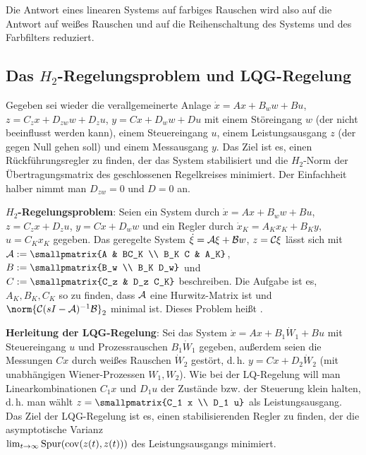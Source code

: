 Die Antwort eines linearen Systems auf farbiges Rauschen wird also auf die Antwort auf weißes
Rauschen und auf die Reihenschaltung des Systems und des Farbfilters reduziert.

\pagebreak

\subsection{%
    Das \texorpdfstring{$H_2$-Regelungsproblem}{H₂-Regelungsproblem} und
    LQG-Regelung%
}

Gegeben sei wieder die verallgemeinerte Anlage $\dot{x} = Ax + B_w w + Bu$,
$z = C_z x + D_{zw} w + D_z u$, $y = Cx + D_w w + Du$
mit einem Störeingang $w$ (der nicht beeinflusst werden kann),
einem Steuereingang $u$,
einem Leistungsausgang $z$ (der gegen Null gehen soll) und
einem Messausgang $y$.
Das Ziel ist es, einen Rückführungsregler zu finden, der das System stabilisiert und
die $H_2$-Norm der Übertragungsmatrix des geschlossenen Regelkreises minimiert.
Der Einfachheit halber nimmt man $D_{zw} = 0$ und $D = 0$ an.

\textbf{$H_2$-Regelungsproblem}:
Seien ein System durch $\dot{x} = Ax + B_w w + Bu$, $z = C_z x + D_z u$, $y = Cx + D_w w$
und ein Regler durch $\dot{x}_K = A_K x_K + B_K y$, $u = C_K x_K$ gegeben.
Das geregelte System $\dot{\xi} = \mathcal{A}\xi + \mathcal{B} w$, $z = \mathcal{C}\xi$ lässt sich mit
$\A := \smallpmatrix{A & BC_K \\ B_K C & A_K}$,
$B := \smallpmatrix{B_w \\ B_K D_w}$ und
$C := \smallpmatrix{C_z & D_z C_K}$ beschreiben.
Die Aufgabe ist es, $A_K, B_K, C_K$ so zu finden, dass
$\mathcal{A}$ eine Hurwitz-Matrix ist und
$\norm{\C (sI - \A)^{-1} \B}_2$ minimal ist.
Dieses Problem heißt .

\linie

\textbf{Herleitung der LQG-Regelung}:
Sei das System $\dot{x} = Ax + B_1 \dot{W}_1 + Bu$ mit Steuereingang $u$ und
Prozessrauschen $B_1 \dot{W}_1$ gegeben, außerdem seien die Messungen $Cx$ durch
weißes Rauschen $\dot{W}_2$ gestört, d.\,h.
$y = Cx + D_2 \dot{W}_2$ (mit unabhängigen Wiener-Prozessen $W_1, W_2$).
Wie bei der LQ-Regelung will man Linearkombinationen $C_1 x$ und $D_1 u$ der Zustände bzw. der
Steuerung klein halten, d.\,h. man wählt
$z = \smallpmatrix{C_1 x \\ D_1 u}$ als Leistungsausgang.
Das Ziel der LQG-Regelung ist es, einen stabilisierenden Regler zu finden, der die
asymptotische Varianz\\
$\lim_{t \to \infty} \operatorname{Spur}(\operatorname{cov}(z(t), z(t)))$ des Leistungsausgangs minimiert.

